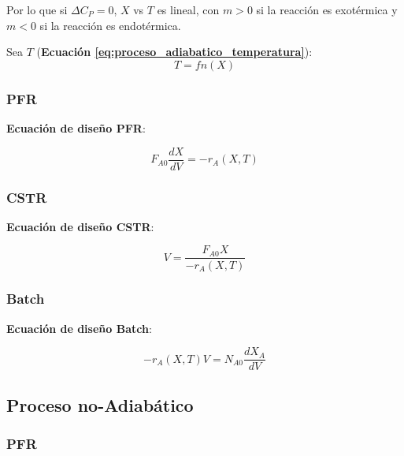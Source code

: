     Por lo que si \(\Delta C_{P} = 0\), \(X\) vs \(T\) es lineal, con \(m > 0\) si la reacción es exotérmica y \(m < 0\) si la reacción es endotérmica.
    
    Sea \(T\) (\textbf{Ecuación \ref{eq:proceso_adiabatico_temperatura}}):
    \[T = fn(X)\]
    
        \subsubsection{PFR}
        
        \textbf{Ecuación de diseño PFR}:
        
        \begin{equation}
        \label{eq:proceso_adiabatico_pfr}
            F_{A0} \frac{dX}{dV} = -r_{A}(X, T)
        \end{equation}
        
        \subsubsection{CSTR}
        
        \textbf{Ecuación de diseño CSTR}:
        
        \begin{equation}
        \label{eq:proceso_adiabatico_cstr}
            V = \frac{F_{A0}X}{-r_{A}(X, T)}
        \end{equation}
        
        \subsubsection{Batch}
        
        \textbf{Ecuación de diseño Batch}:
        
        \begin{equation}
        \label{eq:proceso_adiabatico_batch}
            -r_{A}(X, T)V = N_{A0} \frac{dX_{A}}{dV}
        \end{equation}
    
    \subsection{Proceso no-Adiabático}
    
        \subsubsection{PFR}
        
